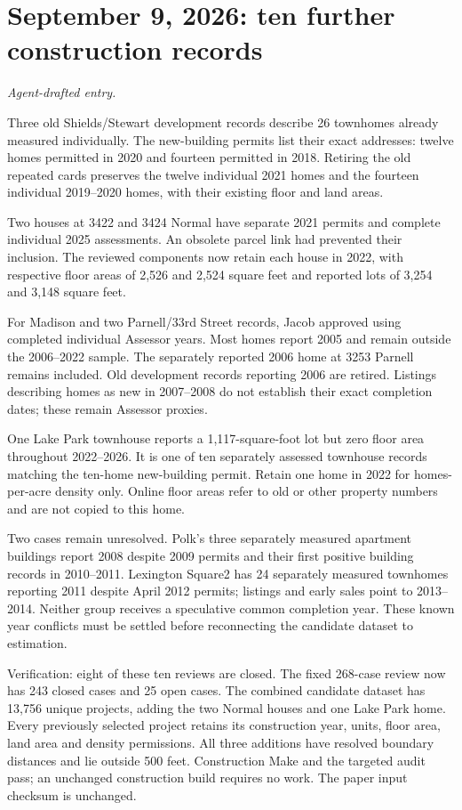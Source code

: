 \clearpage
\section*{September 9, 2026: ten further construction records}
\textit{Agent-drafted entry.}

Three old Shields/Stewart development records describe 26 townhomes already measured individually. The new-building permits list their exact addresses: twelve homes permitted in 2020 and fourteen permitted in 2018. Retiring the old repeated cards preserves the twelve individual 2021 homes and the fourteen individual 2019--2020 homes, with their existing floor and land areas.

Two houses at 3422 and 3424 Normal have separate 2021 permits and complete individual 2025 assessments. An obsolete parcel link had prevented their inclusion. The reviewed components now retain each house in 2022, with respective floor areas of 2,526 and 2,524 square feet and reported lots of 3,254 and 3,148 square feet.

For Madison and two Parnell/33rd Street records, Jacob approved using completed individual Assessor years. Most homes report 2005 and remain outside the 2006--2022 sample. The separately reported 2006 home at 3253 Parnell remains included. Old development records reporting 2006 are retired. Listings describing homes as new in 2007--2008 do not establish their exact completion dates; these remain Assessor proxies.

One Lake Park townhouse reports a 1,117-square-foot lot but zero floor area throughout 2022--2026. It is one of ten separately assessed townhouse records matching the ten-home new-building permit. Retain one home in 2022 for homes-per-acre density only. Online floor areas refer to old or other property numbers and are not copied to this home.

Two cases remain unresolved. Polk's three separately measured apartment buildings report 2008 despite 2009 permits and their first positive building records in 2010--2011. Lexington Square2 has 24 separately measured townhomes reporting 2011 despite April 2012 permits; listings and early sales point to 2013--2014. Neither group receives a speculative common completion year. These known year conflicts must be settled before reconnecting the candidate dataset to estimation.

Verification: eight of these ten reviews are closed. The fixed 268-case review now has 243 closed cases and 25 open cases. The combined candidate dataset has 13,756 unique projects, adding the two Normal houses and one Lake Park home. Every previously selected project retains its construction year, units, floor area, land area and density permissions. All three additions have resolved boundary distances and lie outside 500 feet. Construction Make and the targeted audit pass; an unchanged construction build requires no work. The paper input checksum is unchanged.

